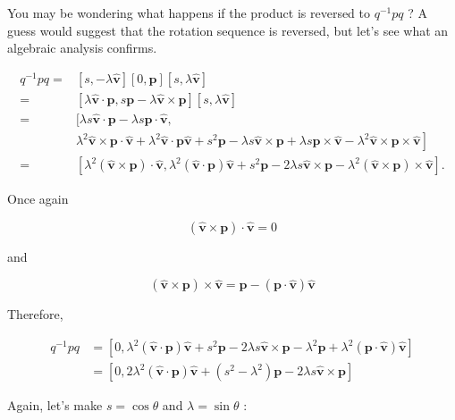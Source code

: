 \documentclass[10pt]{article}
\begin{document}
You may be wondering what happens if the product is reversed to $q^{-1} p q$ ? A guess would suggest that the rotation sequence is reversed, but let's see what an algebraic analysis confirms.

$$
\begin{aligned}
q^{-1} p q= & {[s,-\lambda \hat{\mathbf{v}}][0, \mathbf{p}][s, \lambda \hat{\mathbf{v}}] } \\
= & {[\lambda \hat{\mathbf{v}} \cdot \mathbf{p}, s \mathbf{p}-\lambda \hat{\mathbf{v}} \times \mathbf{p}][s, \lambda \hat{\mathbf{v}}] } \\
= & {[\lambda s \hat{\mathbf{v}} \cdot \mathbf{p}-\lambda s \mathbf{p} \cdot \hat{\mathbf{v}},} \\
& \left.\lambda^{2} \hat{\mathbf{v}} \times \mathbf{p} \cdot \hat{\mathbf{v}}+\lambda^{2} \hat{\mathbf{v}} \cdot \mathbf{p} \hat{\mathbf{v}}+s^{2} \mathbf{p}-\lambda s \hat{\mathbf{v}} \times \mathbf{p}+\lambda s \mathbf{p} \times \hat{\mathbf{v}}-\lambda^{2} \hat{\mathbf{v}} \times \mathbf{p} \times \hat{\mathbf{v}}\right] \\
= & {\left[\lambda^{2}(\hat{\mathbf{v}} \times \mathbf{p}) \cdot \hat{\mathbf{v}}, \lambda^{2}(\hat{\mathbf{v}} \cdot \mathbf{p}) \hat{\mathbf{v}}+s^{2} \mathbf{p}-2 \lambda s \hat{\mathbf{v}} \times \mathbf{p}-\lambda^{2}(\hat{\mathbf{v}} \times \mathbf{p}) \times \hat{\mathbf{v}}\right] . }
\end{aligned}
$$

Once again

$$
(\hat{\mathbf{v}} \times \mathbf{p}) \cdot \hat{\mathbf{v}}=0
$$

and

$$
(\hat{\mathbf{v}} \times \mathbf{p}) \times \hat{\mathbf{v}}=\mathbf{p}-(\mathbf{p} \cdot \hat{\mathbf{v}}) \hat{\mathbf{v}}
$$

Therefore,

$$
\begin{aligned}
q^{-1} p q & =\left[0, \lambda^{2}(\hat{\mathbf{v}} \cdot \mathbf{p}) \hat{\mathbf{v}}+s^{2} \mathbf{p}-2 \lambda s \hat{\mathbf{v}} \times \mathbf{p}-\lambda^{2} \mathbf{p}+\lambda^{2}(\mathbf{p} \cdot \hat{\mathbf{v}}) \hat{\mathbf{v}}\right] \\
& =\left[0,2 \lambda^{2}(\hat{\mathbf{v}} \cdot \mathbf{p}) \hat{\mathbf{v}}+\left(s^{2}-\lambda^{2}\right) \mathbf{p}-2 \lambda s \hat{\mathbf{v}} \times \mathbf{p}\right]
\end{aligned}
$$

Again, let's make $s=\cos \theta$ and $\lambda=\sin \theta$ :
\end{document}
